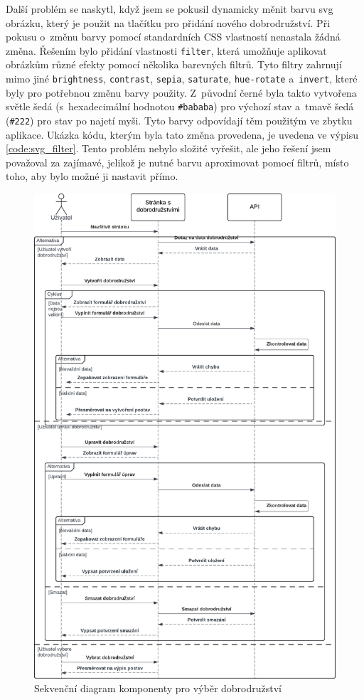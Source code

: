 Další problém se naskytl, když jsem se pokusil dynamicky měnit barvu svg obrázku, který je použit na tlačítku pro přidání nového dobrodružství. Při pokusu o~změnu barvy pomocí standardních CSS vlastností nenastala žádná změna. Řešením bylo přidání vlastnosti \texttt{filter}, která umožňuje aplikovat obrázkům různé efekty pomocí několika barevných filtrů. Tyto filtry zahrnují mimo jiné \texttt{brightness}, \texttt{contrast}, \texttt{sepia}, \texttt{saturate}, \texttt{hue-rotate} a~\texttt{invert}, které byly pro potřebnou změnu barvy použity. Z~původní černé byla takto vytvořena světle šedá (s~hexadecimální hodnotou \texttt{\#bababa}) pro výchozí stav a~tmavě šedá (\texttt{\#222}) pro stav po najetí myši. Tyto barvy odpovídají těm použitým ve zbytku aplikace. Ukázka kódu, kterým byla tato změna provedena, je uvedena ve výpisu \ref{code:svg_filter}. Tento problém nebylo složité vyřešit, ale jeho řešení jsem považoval za zajímavé, jelikož je nutné barvu aproximovat pomocí filtrů, místo toho, aby bylo možné ji nastavit přímo.

\begin{figure}[htbp]
  \centering
  \includegraphics[width=.80\textwidth]{resources/figures/adventure_diagram.pdf}
  \caption{Sekvenční diagram komponenty pro výběr dobrodružství}
  \label{fig:adventure_diagram}
\end{figure}

